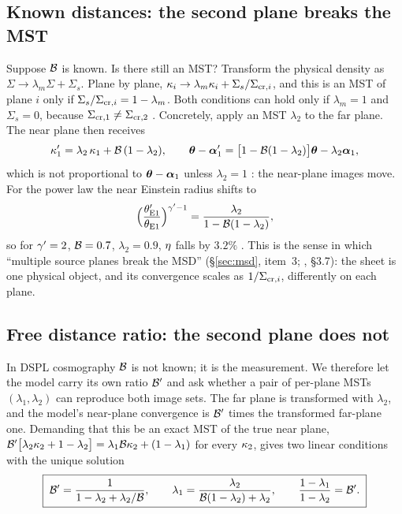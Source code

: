 \subsection{Known distances: the second plane breaks the MST}
\label{sec:ms_known}

Suppose $\mathcal{B}$ is known.  Is there still an MST?  Transform the physical
density as $\Sigma\to\lambda_m\Sigma+\Sigma_s$.  Plane by plane,
$\kappa_i\to\lambda_m\kappa_i+\Sigma_s/\Sigma_{{\rm cr},i}$, and this is an
MST of plane $i$ only if $\Sigma_s/\Sigma_{{\rm cr},i}=1-\lambda_m$.  Both
conditions can hold only if $\lambda_m=1$ and $\Sigma_s=0$, because
$\Sigma_{{\rm cr},1}\neq\Sigma_{{\rm cr},2}$ .  Concretely, apply an
MST $\lambda_2$ to the far plane.  The near plane then receives
\begin{equation}
    \kappa_1'=\lambda_2\,\kappa_1+\mathcal{B}\,(1-\lambda_2),
    \qquad
    \boldsymbol{\theta}-\boldsymbol{\alpha}_1'=\bigl[1-\mathcal{B}(1-\lambda_2)\bigr]\boldsymbol{\theta}-\lambda_2\boldsymbol{\alpha}_1 ,
    \label{eq:ms_known}
\end{equation}
which is not proportional to $\boldsymbol{\theta}-\boldsymbol{\alpha}_1$ unless $\lambda_2=1$
: the near-plane images move.  For the power law the near
Einstein radius shifts to
\begin{equation}
    \Bigl(\frac{\theta_{\rm E1}'}{\theta_{\rm E1}}\Bigr)^{\gamma'-1}
    =\frac{\lambda_2}{1-\mathcal{B}(1-\lambda_2)} ,
    \label{eq:ms_thetaE1_shift}
\end{equation}
so for $\gamma'=2$, $\mathcal{B}=0.7$, $\lambda_2=0.9$, $\eta$ falls by $3.2\%$
.  This is the sense in which ``multiple source planes break
the MSD'' (\S\ref{sec:msd}, item~3; \citealp{saha_essentials_2024}, \S3.7):
the sheet is one physical object, and its convergence scales as
$1/\Sigma_{{\rm cr},i}$, differently on each plane.

\subsection{Free distance ratio: the second plane does not}
\label{sec:ms_free}

In DSPL cosmography $\mathcal{B}$ is not known; it is the measurement.  We
therefore let the model carry its own ratio $\mathcal{B}'$ and ask whether a pair of per-plane MSTs
$(\lambda_1,\lambda_2)$ can reproduce both image sets.  The far plane is
transformed with $\lambda_2$, and the model's near-plane convergence is
$\mathcal{B}'$ times the transformed far-plane one.  Demanding that this be an exact
MST of the true near plane,
$\mathcal{B}'\bigl[\lambda_2\kappa_2+1-\lambda_2\bigr]
=\lambda_1\mathcal{B}\kappa_2+(1-\lambda_1)$ for every $\kappa_2$, gives two
linear conditions with the unique solution
\begin{equation}
    \boxed{\;
    \mathcal{B}'=\frac{1}{1-\lambda_2+\lambda_2/\mathcal{B}},
    \qquad
    \lambda_1=\frac{\lambda_2}{\mathcal{B}(1-\lambda_2)+\lambda_2},
    \qquad
    \frac{1-\lambda_1}{1-\lambda_2}=\mathcal{B}' .\;}
    \label{eq:ms_free}
\end{equation}

